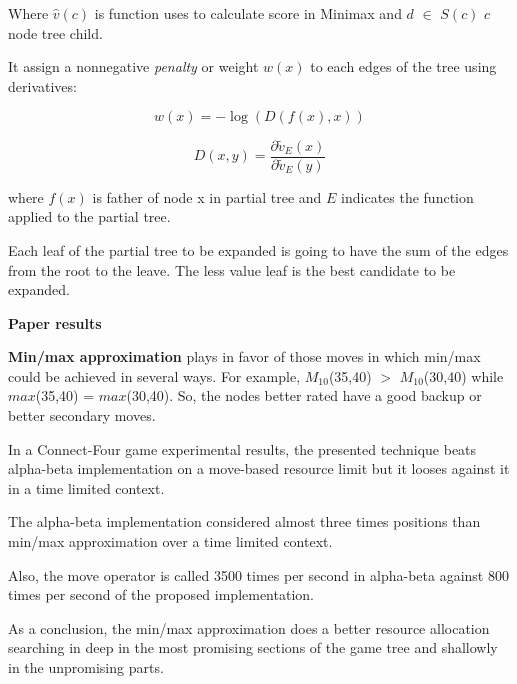\documentclass[10pt, a4paper,english]{article}
\begin{document}
Where $\hat{v}(c)$ is function uses to calculate score in Minimax and $d$ $\in$ $S(c)$ $c$ node tree child. 

It assign a nonnegative \textit{penalty} or weight $w(x)$  to each edges of the tree using derivatives: 

\[
w(x) = -\log(D(f(x),x))
\]

\[
D(x,y) = \frac{\partial \tilde{v}_{E}(x)}{\partial \tilde{v}_{E}(y)}
\]

where $f(x)$ is father of node x in partial tree and $E$ indicates the function applied to the partial tree.

Each leaf of the partial tree to be expanded is going to have the sum of the edges from the root to the leave. The less value leaf is the best candidate to be expanded. 

\bigskip
\noindent\textbf{Paper results}
\bigskip

\textbf{Min/max approximation} plays in favor of those moves in which min/max could be achieved in several ways. For example, $M_{10}$(35,40) $>$ $M_{10}$(30,40) while $max$(35,40) = $max$(30,40). So, the nodes better rated have a good backup or better secondary moves. 

In a Connect-Four game experimental results, the presented technique beats alpha-beta implementation on a move-based resource limit but it looses against it in a time limited context.

The alpha-beta implementation considered almost three times positions than min/max approximation over a time limited context.

Also, the move operator is called 3500 times per second in alpha-beta against 800 times per second of the proposed implementation. 

As a conclusion, the min/max approximation does a better resource allocation searching in deep in the most promising sections of the game tree and shallowly in the unpromising parts.
\end{document}
